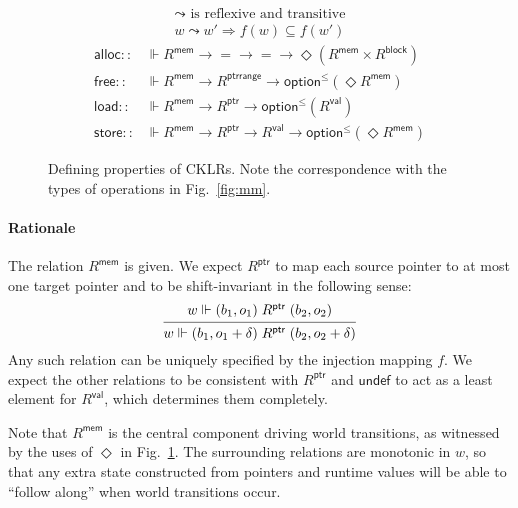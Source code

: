 \documentclass[11pt,oneside,draft]{book}
\theoremstyle{definition}
\newcommand{\kw}[1]{\ensuremath{ \mathsf{#1} }}
\begin{document}
\begin{figure} %
  \begin{gather*}
    {\leadsto} \mbox{ is reflexive and transitive} \\
    w \leadsto w' \Rightarrow f(w) \subseteq f(w')
  \end{gather*}
  \begin{align*}
      \kw{alloc} ::
        &\Vdash R^\kw{mem} \rightarrow {=} \rightarrow {=} \rightarrow
        \Diamond (R^\kw{mem} \times R^\kw{block})
      \\
      \kw{free} ::
        &\Vdash R^\kw{mem} \rightarrow R^\kw{ptrrange} \rightarrow
        \kw{option}^\le(\Diamond R^\kw{mem})
      \\
      \kw{load} ::
        &\Vdash R^\kw{mem} \rightarrow R^\kw{ptr} \rightarrow
        \kw{option}^\le(R^\kw{val})
      \\
      \kw{store} ::
        &\Vdash R^\kw{mem} \rightarrow R^\kw{ptr} \rightarrow R^\kw{val} \rightarrow
        \kw{option}^\le(\Diamond R^\kw{mem})
  \end{align*}
  \caption[Defining properties of CKLRs]%
   {Defining properties of CKLRs.
    Note the correspondence with
    the types of operations in Fig.~\ref{fig:mm}.}
  \label{fig:cklr-def}
\end{figure}

\paragraph{Rationale} %

The relation $R^\kw{mem}$ is given.
We expect $R^\kw{ptr}$ to map
each source pointer to at most one target pointer
and to be shift-invariant in the following sense:
\[
  \begin{prooftree}
    \hypo{w \Vdash (b_1, o_1) \mathrel{R^\kw{ptr}} (b_2, o_2)}
    \infer1{
      w \Vdash (b_1, o_1 + \delta) \mathrel{R^\kw{ptr}} (b_2, o_2 + \delta)}
  \end{prooftree}
\]
Any such relation can be uniquely specified by
the injection mapping $f$.
We expect the other relations to be consistent with $R^\kw{ptr}$
and $\kw{undef}$ to act as a least element for $R^\kw{val}$,
which determines them completely.


Note that $R^\kw{mem}$
is the central component driving world transitions,
as witnessed by the uses of $\Diamond$ in Fig.~\ref{fig:cklr-def}.
The surrounding relations are monotonic in $w$,
so that any extra state
constructed from pointers and runtime values
will be able to ``follow along'' when
world transitions occur.
\end{document}
